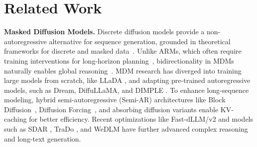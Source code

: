 \section{Related Work}
\noindent\textbf{Masked Diffusion Models.} Discrete diffusion models provide a non-autoregressive alternative for sequence generation, grounded in theoretical frameworks for discrete and masked data~\cite{austin2021structured, lou2024discrete, rombach2022high}. Unlike ARMs, which often require training interventions for long-horizon planning~\cite{hu2025beliefstatetransformer,teoh2025nextlatentpredictiontransformerslearn}, bidirectionality in MDMs naturally enables global reasoning~\cite{ye2024beyond}. MDM research has diverged into training large models from scratch, like LLaDA \cite{nie2025large}, and adapting pre-trained autoregressive models, such as Dream, DiffuLLaMA, and DIMPLE \cite{ye2025dream, gong2024scaling, yu2025dimple}. To enhance long-sequence modeling, hybrid semi-autoregressive (Semi-AR) architectures like Block Diffusion~\cite{arriola2025block}, Diffusion Forcing~\cite{chen2024diffusion}, and absorbing diffusion variants \cite{zheng2025masked} enable KV-caching for better efficiency. Recent optimizations like Fast-dLLM/v2 \cite{wu2025fast, wu2025fastv2} and models such as SDAR \cite{cheng2025sdar}, TraDo \cite{wang2025revolutionizingreinforcementlearningframework}, and WeDLM \cite{liu2025wedlm} have further advanced complex reasoning and long-text generation.

